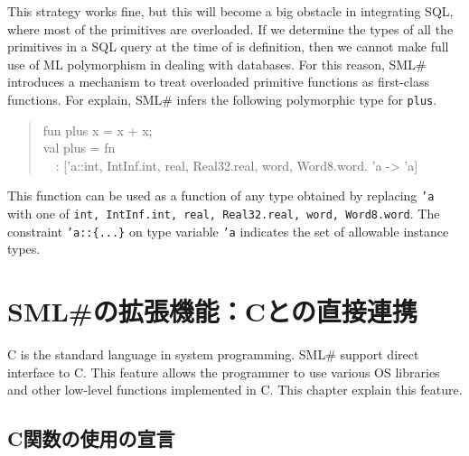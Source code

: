 \documentclass{jbook}
\newif\ifjp
\newcommand{\txt}[2]{#1}
\newcommand{\smlsharp}{SML\#}
\newcommand{\myem}{\mbox{\ \ }}
\begin{document}
	This strategy works fine, but this will become a big obstacle in
integrating SQL, where most of the primitives are overloaded.
	If we determine the types of all the primitives in a SQL query
at the time of is definition, then we cannot make full use of ML
polymorphism in dealing with databases.
	For this reason, \smlsharp{} introduces a mechanism to treat
overloaded primitive functions as first-class functions.
	For explain, \smlsharp{} infers the following polymorphic type
for {\tt plus}.
\begin{tt}
\begin{quote}
fun plus x = x + x;\\
val plus = fn\\
\myem  : ['a::{int, IntInf.int, real, Real32.real, word, Word8.word}. 'a -> 'a]
\end{quote}
\end{tt}
	This function can be used as a function of any type obtained by
replacing {\tt 'a} with one of {\tt int, IntInf.int, real,
Real32.real, word, Word8.word}.
	The constraint {\tt 'a::\{...\}} on type variable {\tt 'a}
indicates the set of allowable instance types.
\fi%


\chapter{
\txt{\smlsharp{}の拡張機能：Cとの直接連携}
    {\smlsharp{} feature: direct interface to C}
}
\label{chap:tutorialCFFI}

\ifjp%
	\smlsharp{}は，C言語とのシームレスな直接連携をサポートしています．
	C言語は事実上のシステム記述言語です．
	OSが提供するシステムサービスなども，C言語のインターフェイスとし
て提供されています．
	\smlsharp{}では，これら機能を，特別なライブラリなどを開発するこ
となく直接利用することができます．
	本節では，その利用方法を学びます．
\else%
	C is the standard language in system programming.
	\smlsharp{} support direct interface to C.
	This feature allows the programmer to use various OS libraries
and other low-level functions implemented in C.
	This chapter explain this feature.
\fi%

\section{\txt{C関数の使用の宣言}{Declaring and using C functions}}
\label{sec:extensionCdecl}
\end{document}
